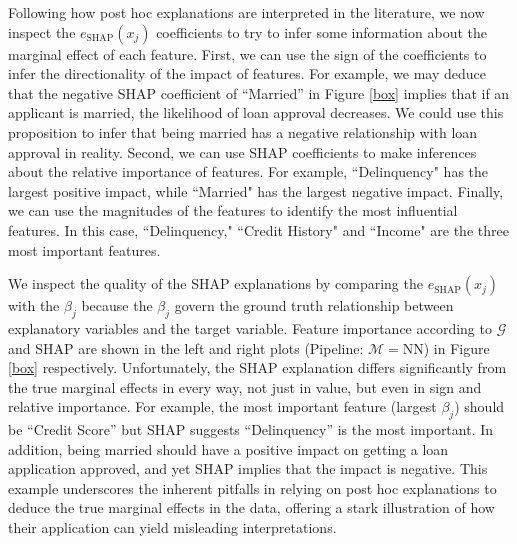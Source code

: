 \documentclass[12pt]{article}  %
\newcommand{\mM}{\mathcal{M}}
\begin{document}
 Following how post hoc explanations are interpreted in the literature, we now inspect the $e_\text{SHAP}(x_j)$ coefficients to try to infer some information about the marginal effect of each feature. First, we can use the sign of the coefficients to infer the directionality of the impact of features. For example, we may deduce that the negative SHAP coefficient of ``Married'' in Figure \ref{box} implies that if an applicant is married, the likelihood of loan approval decreases. We could use this proposition to infer that being married has a negative relationship with loan approval in reality. Second, we can use SHAP coefficients to make inferences about the relative importance of features. For example, ``Delinquency" has the largest positive impact, while ``Married" has the largest negative impact. Finally, we can use the magnitudes of the features to identify the most influential features. In this case, ``Delinquency," ``Credit History" and ``Income" are the three most important features. 

We inspect the quality of the SHAP explanations by comparing the $e_\text{SHAP}(x_j)$ with the $\beta_j$ because the $\beta_j$ govern the ground truth relationship between explanatory variables and the target variable. Feature importance according to $\mathcal{G}$ and SHAP are shown in the left and right plots (Pipeline: $\mM=$NN) in Figure \ref{box} respectively. Unfortunately, the SHAP explanation differs significantly from the true marginal effects in every way, not just in value, but even in sign and relative importance. For example, the most important feature (largest $\beta_j$) should be ``Credit Score'' but SHAP suggests ``Delinquency'' is the most important. In addition, being married should have a positive impact on getting a loan application approved, and yet SHAP implies that the impact is negative. This example underscores the inherent pitfalls in relying on post hoc explanations to deduce the true marginal effects in the data, offering a stark illustration of how their application can yield misleading interpretations. 
\end{document}
